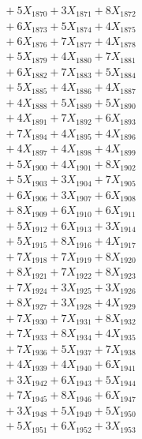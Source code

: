 \documentclass[a4paper,10pt]{article}
\begin{document}
{\begin{align}
&\;  + 5 X_{1870} + 3 X_{1871} + 8 X_{1872} \\[0.3ex]
&\;  + 6 X_{1873} + 5 X_{1874} + 4 X_{1875} \\[0.3ex]
&\;  + 6 X_{1876} + 7 X_{1877} + 4 X_{1878} \\[0.3ex]
&\;  + 5 X_{1879} + 4 X_{1880} + 7 X_{1881} \\[0.3ex]
&\;  + 6 X_{1882} + 7 X_{1883} + 5 X_{1884} \\[0.3ex]
&\;  + 5 X_{1885} + 4 X_{1886} + 4 X_{1887} \\[0.3ex]
&\;  + 4 X_{1888} + 5 X_{1889} + 5 X_{1890} \\[0.3ex]
&\;  + 4 X_{1891} + 7 X_{1892} + 6 X_{1893} \\[0.3ex]
&\;  + 7 X_{1894} + 4 X_{1895} + 4 X_{1896} \\[0.3ex]
&\;  + 4 X_{1897} + 4 X_{1898} + 4 X_{1899} \\[0.5ex]\allowbreak
&\;  + 5 X_{1900} + 4 X_{1901} + 8 X_{1902} \\[0.3ex]
&\;  + 5 X_{1903} + 3 X_{1904} + 7 X_{1905} \\[0.3ex]
&\;  + 6 X_{1906} + 3 X_{1907} + 6 X_{1908} \\[0.3ex]
&\;  + 8 X_{1909} + 6 X_{1910} + 6 X_{1911} \\[0.3ex]
&\;  + 5 X_{1912} + 6 X_{1913} + 3 X_{1914} \\[0.3ex]
&\;  + 5 X_{1915} + 8 X_{1916} + 4 X_{1917} \\[0.3ex]
&\;  + 7 X_{1918} + 7 X_{1919} + 8 X_{1920} \\[0.3ex]
&\;  + 8 X_{1921} + 7 X_{1922} + 8 X_{1923} \\[0.3ex]
&\;  + 7 X_{1924} + 3 X_{1925} + 3 X_{1926} \\[0.3ex]
&\;  + 8 X_{1927} + 3 X_{1928} + 4 X_{1929} \\[0.5ex]\allowbreak
&\;  + 7 X_{1930} + 7 X_{1931} + 8 X_{1932} \\[0.3ex]
&\;  + 7 X_{1933} + 8 X_{1934} + 4 X_{1935} \\[0.3ex]
&\;  + 7 X_{1936} + 5 X_{1937} + 7 X_{1938} \\[0.3ex]
&\;  + 4 X_{1939} + 4 X_{1940} + 6 X_{1941} \\[0.3ex]
&\;  + 3 X_{1942} + 6 X_{1943} + 5 X_{1944} \\[0.3ex]
&\;  + 7 X_{1945} + 8 X_{1946} + 6 X_{1947} \\[0.3ex]
&\;  + 3 X_{1948} + 5 X_{1949} + 5 X_{1950} \\[0.3ex]
&\;  + 5 X_{1951} + 6 X_{1952} + 3 X_{1953} \\[0.3ex]

\end{align}}
\end{document}

